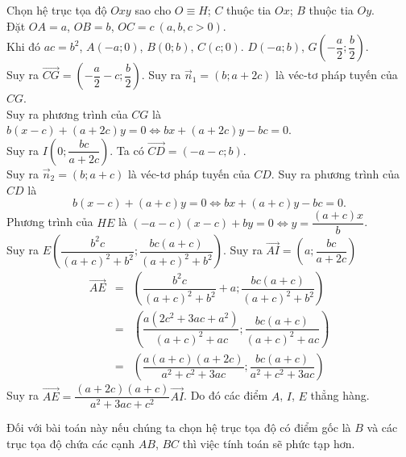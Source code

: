 \begin{bt}
{\begin{center}
		\end{center}
		Chọn hệ trục tọa độ $Oxy$ sao cho $O\equiv H$; $C$ thuộc tia $Ox$; $B$ thuộc tia $Oy$.\\
		Đặt $OA=a$, $OB=b$, $OC=c\ (a,b,c>0)$.\\
		Khi đó $ac=b^2$, $A(-a;0)$, $B(0;b)$, $C(c;0)$. $D(-a;b)$, $G\left(-\dfrac{a}{2};\dfrac{b}{2} \right) $.\\
		Suy ra $\overrightarrow{CG}=\left(-\dfrac{a}{2}-c;\dfrac{b}{2} \right) $. Suy ra $\overrightarrow{n}_1=(b;a+2c)$ là véc-tơ pháp tuyến của $CG$.\\
		Suy ra phương trình của $CG$ là $b(x-c)+(a+2c)y=0\Leftrightarrow bx+(a+2c)y-bc=0$.\\
		Suy ra $I\left(0; \dfrac{bc}{a+2c} \right) $. Ta có $\overrightarrow{CD}=(-a-c;b)$.\\
		Suy ra $\overrightarrow{n}_2=(b;a+c)$ là véc-tơ pháp tuyến của $CD$.
		Suy ra phương trình của $CD$ là 
		$$b(x-c)+(a+c)y=0\Leftrightarrow bx+(a+c)y-bc=0.$$
		Phương trình của $HE$ là $(-a-c)(x-c)+by=0\Leftrightarrow y=\dfrac{(a+c)x}{b}$.\\
		Suy ra $E\left(\dfrac{b^2 c}{(a+c)^2+b^2};\dfrac{bc(a+c)}{(a+c)^2+b^2} \right) $. Suy ra $\overrightarrow{AI}=\left(a;\dfrac{bc}{a+2c} \right) $
		{\allowdisplaybreaks
		\begin{eqnarray*}
			\overrightarrow{AE}&=&\left(\dfrac{b^2 c}{(a+c)^2+b^2}+a;\dfrac{bc(a+c)}{(a+c)^2+b^2} \right)\\
			&=&\left(\dfrac{a(2c^2+3ac+a^2)}{(a+c)^2+ac};\dfrac{bc(a+c)}{(a+c)^2+ac} \right)\\
			&=&\left(\dfrac{a(a+c)(a+2c)}{a^2+c^2+3ac};\dfrac{bc(a+c)}{a^2+c^2+3ac} \right)
		\end{eqnarray*}}Suy ra $\overrightarrow{AE}=\dfrac{(a+2c)(a+c)}{a^2+3ac+c^2}\overrightarrow{AI}$.
	Do đó các điểm $A$, $I$, $E$ thẳng hàng.
		\begin{nx}
			Đối với bài toán này nếu chúng ta chọn hệ trục tọa độ có điểm gốc là $B$ và các trục tọa độ chứa các cạnh $AB$, $BC$ thì việc tính toán sẽ phức tạp hơn.
		\end{nx}
		
	}
\end{bt}
